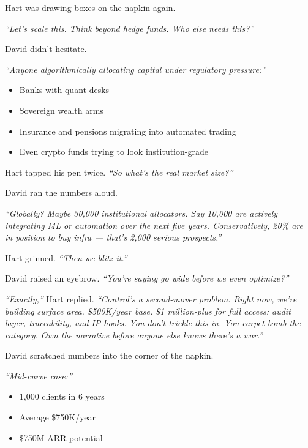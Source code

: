 \medskip



Hart was drawing boxes on the napkin again.

\textit{``Let’s scale this. Think beyond hedge funds. Who else needs this?''}

David didn’t hesitate.

\textit{``Anyone algorithmically allocating capital under regulatory pressure:''}

\begin{itemize}
  \item Banks with quant desks  
  \item Sovereign wealth arms  
  \item Insurance and pensions migrating into automated trading  
  \item Even crypto funds trying to look institution-grade
\end{itemize}

Hart tapped his pen twice. \textit{``So what’s the real market size?''}

David ran the numbers aloud.

\textit{``Globally? Maybe 30{,}000 institutional allocators.  
Say 10{,}000 are actively integrating ML or automation over the next five years.  
Conservatively, 20\% are in position to buy infra — that’s 2{,}000 serious prospects.''}

Hart grinned. \textit{``Then we blitz it.''}

David raised an eyebrow. \textit{``You’re saying go wide before we even optimize?''}

\textit{``Exactly,''} Hart replied. \textit{``Control’s a second-mover problem.  
Right now, we’re building surface area. \$500K/year base. \$1 million-plus for full access: audit layer, 
traceability, and IP hooks.  
You don’t trickle this in. You carpet-bomb the category. Own the narrative before anyone else knows 
there’s a war.''}

David scratched numbers into the corner of the napkin.

\textit{``Mid-curve case:''}

\begin{itemize}
  \item 1{,}000 clients in 6 years  
  \item Average \$750K/year  
  \item \$750M ARR potential
\end{itemize}


\medskip

